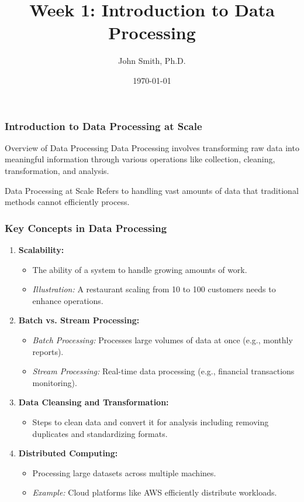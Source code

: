 \documentclass[aspectratio=169]{beamer}
\title[Data Processing]{Week 1: Introduction to Data Processing}
\author[J. Smith]{John Smith, Ph.D.}
\institute[University Name]{
  Department of Computer Science\\
  University Name\\
  \vspace{0.3cm}
  Email: email@university.edu\\
  Website: www.university.edu
}
\date{\today}
\begin{document}
\frame{\titlepage}

\begin{frame}[fragile]
    \frametitle{Introduction to Data Processing at Scale}
    \begin{block}{Overview of Data Processing}
        Data Processing involves transforming raw data into meaningful information through various operations like collection, cleaning, transformation, and analysis.
    \end{block}
    \begin{block}{Data Processing at Scale}
        Refers to handling vast amounts of data that traditional methods cannot efficiently process.
    \end{block}
\end{frame}

\begin{frame}[fragile]
    \frametitle{Key Concepts in Data Processing}
    \begin{enumerate}
        \item \textbf{Scalability:}
        \begin{itemize}
            \item The ability of a system to handle growing amounts of work.
            \item \textit{Illustration:} A restaurant scaling from 10 to 100 customers needs to enhance operations.
        \end{itemize}

        \item \textbf{Batch vs. Stream Processing:}
        \begin{itemize}
            \item \textit{Batch Processing:} Processes large volumes of data at once (e.g., monthly reports).
            \item \textit{Stream Processing:} Real-time data processing (e.g., financial transactions monitoring).
        \end{itemize}

        \item \textbf{Data Cleansing and Transformation:}
        \begin{itemize}
            \item Steps to clean data and convert it for analysis including removing duplicates and standardizing formats.
        \end{itemize}
        
        \item \textbf{Distributed Computing:}
        \begin{itemize}
            \item Processing large datasets across multiple machines.
            \item \textit{Example:} Cloud platforms like AWS efficiently distribute workloads.
        \end{itemize}
    \end{enumerate}
\end{frame}
\end{document}
